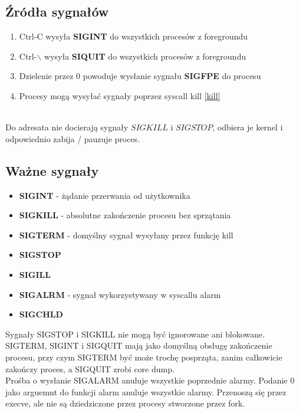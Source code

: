 \documentclass[12pt, a4paper, polish, openany]{book}
\begin{document}
\subsection{Źródła sygnałów}
\begin{enumerate}
  \item Ctrl-C wysyła \textbf{SIGINT} do wszystkich procesów z foregroundu
  \item Ctrl-$\backslash$ wysyła \textbf{SIQUIT} do wszystkich procesów z foregroundu
  \item Dzielenie przez 0 powoduje wysłanie sygnału \textbf{SIGFPE} do procesu
  \item Procesy mogą wysyłać sygnały poprzez syscall kill \ref{kill}
\end{enumerate}
\\
Do adresata nie docierają sygnały $SIGKILL$ i $SIGSTOP$, odbiera je kernel i odpowiednio zabija / pauzuje proces.
\subsection{Ważne sygnały}
\begin{itemize}
  \item \textbf{SIGINT} - żądanie przerwania od użytkownika
  \item \textbf{SIGKILL} - absolutne zakończenie procesu bez sprzątania
  \item \textbf{SIGTERM} - domyślny sygnał wysyłany przez funkcję kill
  \item \textbf{SIGSTOP}
  \item \textbf{SIGILL}
  \item \textbf{SIGALRM} - sygnał wykorzystywany w syscallu alarm
  \item \textbf{SIGCHLD}
\end{itemize}
Sygnały SIGSTOP i SIGKILL nie mogą być ignorowane ani blokowane.
SIGTERM, SIGINT i SIGQUIT mają jako domyślną obsługę zakończenie procesu, przy czym SIGTERM być może trochę posprząta, zanim całkowicie zakończy proces, a SIGQUIT zrobi core dump. \\
Prośba o wysłanie SIGALARM anuluje wszystkie poprzednie alarmy. Podanie 0 jako arguemnt do funkcji alarm anuluje wszystkie alarmy. Przenoszą się przez execve, ale nie są dziedziczone przez procesy stworzone przez fork.
\end{document}
